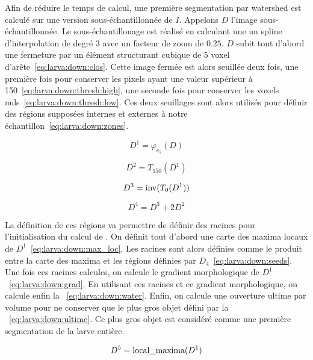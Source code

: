 \documentclass[\main/main.tex]{subfiles}
\begin{document}
%
Afin de réduire le temps de calcul, une première segmentation par watershed est calculé sur une version sous\hyp{}échantillonnée de $I$.
%
Appelons $D$ l'image sous\hyp{}échantillonnée.
%
Le sous-échantillonage est réalisé en calculant une un spline d'interpolation de degré 3 avec un facteur de zoom de $0.25$.
%
$D$ subit tout d'abord une fermeture par un élément structurant cubique de 5 voxel d'arête~\eqref{eq:larva:down:clos}.
%
Cette image fermée est alors seuillée deux fois, une première fois pour conserver les pixels ayant une valeur supérieur à 150~\eqref{eq:larva:down:thresh:high}, une seconde fois pour conserver les voxels nuls~\eqref{eq:larva:down:thresh:low}.
%
Ces deux seuillages sont alors utilisés pour définir des régions supposées internes et externes à notre échantillon~\eqref{eq:larva:down:zones}.

\begin{equation}
    \label{eq:larva:down:clos}
    D^1 = \varphi_{c_{5}}(D)
\end{equation}

\begin{equation}
    \label{eq:larva:down:thresh:high}
    D^2 = T_{150}(D^{1})
\end{equation}

\begin{equation}
    \label{eq:larva:down:thresh:low}
    D^3 = \operatorname{\textnormal{inv}}(T_{0}(D^{1}))
\end{equation}

\begin{equation}
    \label{eq:larva:down:zones}
    D^{4} = D^3 + 2D^{2} 
\end{equation}

%
La définition de ces régions va permettre de définir des racines pour l'initialisation du calcul de \watershed{}.
%
On définit tout d'abord une carte des maxima locaux de $D^1$~\eqref{eq:larva:down:max_loc}.
%
Les racines sont alors définies comme le produit entre la carte des maxima et les régions définies par $D_{4}$~\eqref{eq:larva:down:seeds}.
%
Une fois ces racines calcules, on calcule le gradient morphologique de $D^1$~\eqref{eq:larva:down:grad}.
%
En utilisant ces racines et ce gradient morphologique, on calcule enfin la \watershed{}~\eqref{eq:larva:down:water}.
%
Enfin, on calcule une ouverture ultime par volume pour ne conserver que le plus gros objet défini par la \watershed{}~\eqref{eq:larva:down:ultime}.
%
Ce plus gros objet est considéré comme une première segmentation de la larve entière.

\begin{equation}
    \label{eq:larva:down:max_loc}
    D^{5} = \operatorname{\textnormal{local\_maxima}}(D^1) \\
\end{equation}
\end{document}
